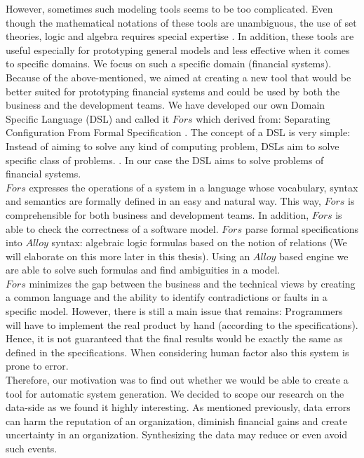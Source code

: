 \documentclass[oneside]{book}
\begin{document}
However, sometimes such modeling tools seems to be too complicated. Even though the mathematical notations of these tools are unambiguous, the use of set theories, logic and algebra requires special expertise \cite[p.~10]{fors}. In addition, these tools are useful especially for prototyping general models and less effective when it comes to specific domains. We focus on such a specific domain (financial systems). \\

Because of the above-mentioned, we aimed at creating a new tool that would be better suited for prototyping financial systems and could be used by both the business and the development teams. We have developed our own Domain Specific Language (DSL) and called it $Fors$ which derived from: Separating Configuration From Formal Specification \cite{fors}. The concept of a DSL is very simple: Instead of aiming to solve any kind of computing problem, DSLs aim to solve specific class of problems. \cite{dsl}. In our case the DSL aims to solve problems of financial systems.  \\

$Fors$ expresses the operations of a system in a language whose vocabulary, syntax and semantics are formally defined in an easy and natural way. This way, $Fors$ is comprehensible for both business and development teams. In addition, $Fors$ is able to check the correctness of a software model. $Fors$ parse formal specifications into $Alloy$ syntax: algebraic logic formulas based on the notion of relations (We will elaborate on this more later in this thesis). Using an $Alloy$ based engine we are able to solve such formulas and find ambiguities in a model. \\

$Fors$ minimizes the gap between the business and the technical views by creating a common language and the ability to identify contradictions or faults in a specific model. However, there is still a main issue that remains: Programmers will have to implement the real product by hand (according to the specifications). Hence, it is not guaranteed that the final results would be exactly the same as defined in the specifications. When considering human factor also this system is prone to error. \\

Therefore, our motivation was to find out whether we would be able to create a tool for automatic system generation. We decided to scope our research on the data-side as we found it highly interesting. As mentioned previously, data errors can harm the reputation of an organization, diminish financial gains and create uncertainty in an organization. Synthesizing the data may reduce or even avoid such events.\\
\end{document}
